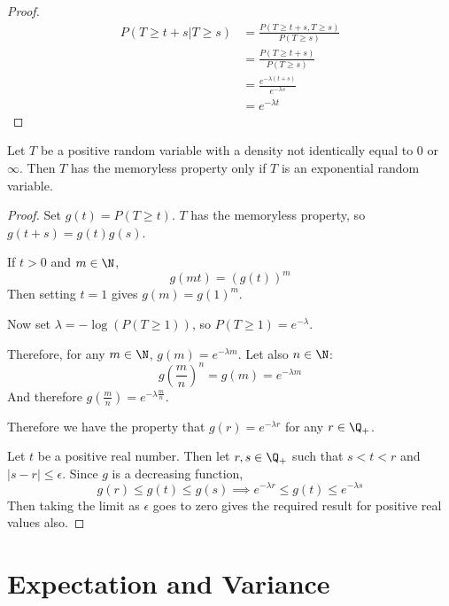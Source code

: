 \documentclass[../Main.tex]{subfiles}
\begin{document}
\begin{proof}
    \begin{align*}
        P(T \geq t + s | T \geq s) &= \frac{P(T \geq t + s, T \geq s)}{P(T \geq s)} \\
        &= \frac{P(T \geq t + s)}{P(T \geq s)} \\
        &= \frac{e^{-\lambda(t + s)}}{e^{-\lambda s}} \\
        &= e^{-\lambda t}
    \end{align*}
\end{proof}
\begin{theorem}
    Let $T$ be a positive random variable with a density not identically equal to $0$ or $\infty$. Then $T$ has the memoryless property only if $T$ is an exponential random variable.
    \label{thmExpMemorylessUnique}
\end{theorem}
\begin{proof}
    Set $g(t) = P(T \geq t)$. $T$ has the memoryless property, so $g(t + s) = g(t) g(s)$.\par
    If $t > 0$ and $m \in \N$,
    \begin{equation*}
        g(mt) = \left(g(t)\right)^m
    \end{equation*}
    Then setting $t = 1$ gives $g(m) = g(1)^m$.\par
    Now set $\lambda = -\log(P(T \geq 1))$, so $P(T \geq 1) = e^{-\lambda}$.\par
    Therefore, for any $m \in \N$, $g(m) = e^{-\lambda m}$. Let also $n \in \N$:
    \begin{equation*}
        g(\frac{m}{n})^n = g(m) = e^{-\lambda m}
    \end{equation*}
    And therefore $g(\frac{m}{n}) = e^{-\lambda \frac{m}{n}}$.

    Therefore we have the property that $g(r) = e^{-\lambda r}$ for any $r \in \Q_+$.\par
    Let $t$ be a positive real number. Then let $r,s \in \Q_+$ such that $s < t < r$ and $|s - r| \leq \epsilon$. Since $g$ is a decreasing function,
    \begin{equation*}
        g(r) \leq g(t) \leq g(s) \implies e^{-\lambda r} \leq g(t) \leq e^{-\lambda s}
    \end{equation*}
    Then taking the limit as $\epsilon$ goes to zero gives the required result for positive real values also.
\end{proof}
\section{Expectation and Variance}
\end{document}

